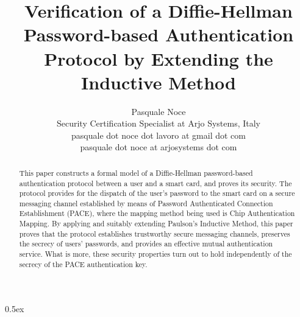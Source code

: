 \documentclass[11pt,a4paper]{article}
\begin{document}
\title{Verification of a Diffie-Hellman Password-based Authentication Protocol by Extending the Inductive Method}
\author{Pasquale Noce\\Security Certification Specialist at Arjo Systems, Italy\\pasquale dot noce dot lavoro at gmail dot com\\pasquale dot noce at arjosystems dot com}
\maketitle

\begin{abstract}
This paper constructs a formal model of a Diffie-Hellman password-based
authentication protocol between a user and a smart card, and proves its
security. The protocol provides for the dispatch of the user's password to the
smart card on a secure messaging channel established by means of Password
Authenticated Connection Establishment (PACE), where the mapping method being
used is Chip Authentication Mapping. By applying and suitably extending
Paulson's Inductive Method, this paper proves that the protocol establishes
trustworthy secure messaging channels, preserves the secrecy of users'
passwords, and provides an effective mutual authentication service. What is
more, these security properties turn out to hold independently of the secrecy of
the PACE authentication key.
\end{abstract}

\tableofcontents

\parindent 0pt\parskip 0.5ex





\end{document}
